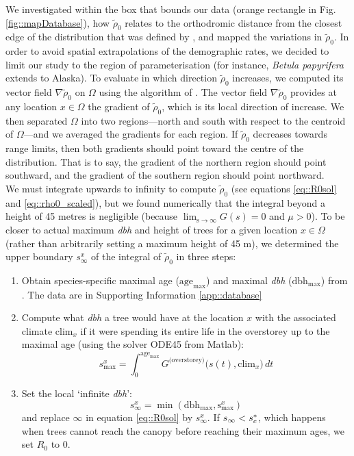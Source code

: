 We investigated within the box that bounds our data (orange rectangle in Fig. \ref{fig::mapDatabase}), how $ \tilde \rho_0 $ relates to the orthodromic distance from the closest edge of the distribution that was defined by \citet{Little1971}, and mapped the variations in $ \tilde \rho_0 $. In order to avoid spatial extrapolations of the demographic rates, we decided to limit our study to the region of parameterisation (for instance, \textit{Betula papyrifera} extends to Alaska). To evaluate in which direction $ \tilde \rho_0 $ increases, we computed its vector field $ \nabla \tilde \rho_0 $ on $ \Omega $ using the algorithm of \citet{Ritter1987}. The vector field $ \nabla \tilde \rho_0 $ provides at any location $ x \in \Omega $ the gradient of $ \tilde \rho_0 $, which is its local direction of increase. We then separated $ \Omega $ into two regions---north and south with respect to the centroid of $ \Omega $---and we averaged the gradients for each region. If $ \tilde \rho_0 $ decreases towards range limits, then both gradients should point toward the centre of the distribution. That is to say, the gradient of the northern region should point southward, and the gradient of the southern region should point northward. \\

We must integrate upwards to infinity to compute $ \tilde \rho_0 $ (see equations \eqref{eq::R0sol} and \eqref{eq::rho0_scaled}), but we found numerically that the integral beyond a height of 45 metres is negligible (because $ \lim_{\text{s} \to \infty} G(s) = 0 $ and $ \mu > 0 $). To be closer to actual maximum \textit{dbh} and height of trees for a given location $ x \in \Omega $ (rather than arbitrarily setting a maximum height of 45 m), we determined the upper boundary $ s_{\infty}^{x} $ of the integral of $ \tilde \rho_0 $ in three steps:
\begin{enumerate}
	\item Obtain species-specific maximal age ($ \text{age}_{\max} $) and maximal \textit{dbh} ($ \text{dbh}_{\max} $) from \citet{Burns1990, Burns1990a}. The data are in Supporting Information \ref{app::database}
	\item Compute what \textit{dbh} a tree would have at the location $ x $ with the associated climate $ \text{clim}_x $ if it were spending its entire life in the overstorey up to the maximal age (using the solver ODE45 from Matlab):
	\[
		s_{\max}^{x} = \int_0^{\text{age}_{\max}} G^{\text{(overstorey)}}\big(s(t), \text{clim}_x \big) \, dt
	\]
	\item Set the local `infinite \textit{dbh}':
	\begin{equation} \label{eq::s_inf}
		s_{\infty}^{x} = \min(\text{dbh}_{\max}, \text{s}_{\max}^{x})
	\end{equation}
	and replace $ \infty $ in equation \eqref{eq::R0sol} by $ s_{\infty}^{x} $. If $ s_{\infty} < {s}^{*}_c $, which happens when trees cannot reach the canopy before reaching their maximum ages, we set $ R_0 $ to 0.
\end{enumerate}

